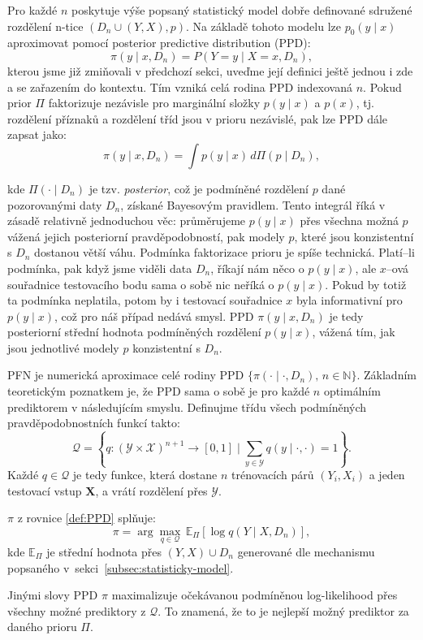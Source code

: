 Pro každé $n$ poskytuje výše popsaný statistický model dobře definované sdružené rozdělení n-tice $(D_n \cup (Y, X), p)$. 
Na základě tohoto modelu lze $p_0(y \mid x)$ aproximovat pomocí posterior predictive distribution (PPD):
$$\pi(y \mid x, D_n) = P(Y = y \mid X = x, D_n),$$
kterou jsme již zmiňovali v předchozí sekci, uveďme její definici ještě jednou i zde a se zařazením do kontextu.
Tím vzniká celá rodina PPD indexovaná $n$. 
Pokud prior $\Pi$ faktorizuje nezávisle pro marginální složky $p(y \mid x)$ a $p(x)$, tj. rozdělení příznaků a rozdělení tříd jsou v prioru nezávislé, pak lze PPD dále zapsat jako:
\begin{equation}
    \pi(y \mid x, D_n) = \int p(y \mid x) \, d\Pi(p \mid D_n),
\label{def:PPD}
\end{equation}

kde $\Pi(\cdot \mid D_n)$ je tzv. \textit{posterior}, což je podmíněné rozdělení $p$ dané pozorovanými daty $D_n$, získané Bayesovým pravidlem. 
Tento integrál říká v zásadě relativně jednoduchou věc: průměrujeme $p(y \mid x)$ přes všechna možná $p$ vážená jejich posteriorní pravděpodobností, pak modely $p$, které jsou konzistentní s $D_n$ dostanou větší váhu.
Podmínka faktorizace prioru je spíše technická.
Platí–li podmínka, pak když jsme viděli data $D_n$, říkají nám něco o $p(y \mid x)$, ale $x$–ová souřadnice testovacího bodu sama o sobě nic neříká o $p(y \mid x)$.
Pokud by totiž ta podmínka neplatila, potom by i testovací souřadnice $x$ byla informativní pro $p(y \mid x)$, což pro náš případ nedává smysl.
PPD $\pi(y \mid x, D_n)$ je tedy posteriorní střední hodnota podmíněných rozdělení $p(y \mid x)$, vážená tím, jak jsou jednotlivé modely $p$ konzistentní s $D_n$.
\par   

PFN je numerická aproximace celé rodiny PPD $\{\pi(\cdot \mid \cdot, D_n),\, n \in \mathbb{N}\}$.
Základním teoretickým poznatkem je, že PPD sama o sobě je pro každé $n$ optimálním prediktorem v následujícím smyslu. 
Definujme třídu všech podmíněných pravděpodobnostních funkcí takto:
$$\mathcal{Q} = \left\{ q : (\mathcal{Y} \times \mathcal{X})^{n+1} \to [0,1] \;\Big|\; \sum_{y \in \mathcal{Y}} q(y \mid \cdot, \cdot) = 1 \right\}.$$
Každé $q \in \mathcal{Q}$ je tedy funkce, která dostane $n$ trénovacích párů $(Y_i, X_i)$ a jeden testovací vstup $\mathbf{X}$, a vrátí rozdělení přes $\mathcal{Y}$.
\begin{theorem}
    $\pi$ z rovnice \ref{def:PPD} splňuje:
    \begin{equation}
            \pi = \arg\max_{q \in \mathcal{Q}} \, \mathbb{E}_\Pi[\log q(Y \mid X, D_n)],
    \end{equation}
    kde $\mathbb{E}_\Pi$ je střední hodnota přes $(Y, X) \cup D_n$ generované dle mechanismu popsaného v~sekci~\ref{subsec:statisticky-model}.
\label{theorem:prior_je_max}
\end{theorem}
Jinými slovy PPD $\pi$ maximalizuje očekávanou podmíněnou log-likelihood přes všechny možné prediktory z $\mathcal{Q}$. 
To znamená, že to je nejlepší možný prediktor za daného prioru $\Pi$.

